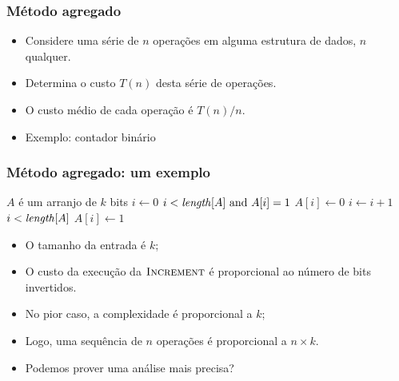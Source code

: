 \documentclass[handout]{beamer}
\begin{document}
\begin{frame}

\frametitle{Método agregado}

\begin{itemize}
\item Considere uma série de $n$ operações em alguma estrutura de dados, $n$
  qualquer.

\item Determina o custo $T(n)$ desta série de operações.

\item O custo médio de cada operação é $T(n)/n$.

\item Exemplo: contador binário
\end{itemize}

\end{frame}

\begin{frame}

\frametitle{Método agregado: um exemplo}

  \begin{codebox}
    \zi \Comment $A$ é um arranjo de $k$ bits
    \li $i \gets 0$
    \li \While $i < \id{length}[A] \mbox{ and } A[i] = 1$
    \li \Do $A[i] \gets 0$
    \li   $i \gets i + 1$
        \End
    \li \If $i < \id{length}[A]$
    \li \Then
    \li    $A[i] \gets 1$
        \End
  \end{codebox}

\begin{itemize}
\item O tamanho da entrada é $k$;
\item O custo da execução da $\textnormal{\scshape Increment}$ é proporcional ao número de bits
  invertidos.
\item No pior caso, a complexidade é proporcional a $k$;
\item Logo, uma sequência de $n$ operações é proporcional a $n \times k$.
\pause
\item Podemos prover uma análise mais precisa?
\end{itemize}

\end{frame}
\end{document}
